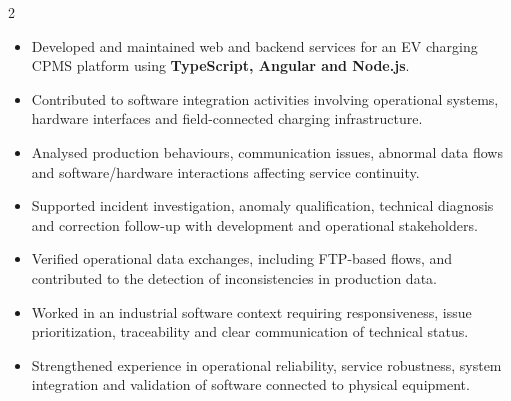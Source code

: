 \documentclass[8pt,a4paper,ragged2e,withhyper]{altacv}
\begin{document}



\makecvheader

\vspace{-0.3cm}


\begin{paracol}{2}



\begin{itemize}
\item Developed and maintained web and backend services for an EV charging CPMS platform using \textbf{TypeScript, Angular and Node.js}.
\item Contributed to software integration activities involving operational systems, hardware interfaces and field-connected charging infrastructure.
\item Analysed production behaviours, communication issues, abnormal data flows and software/hardware interactions affecting service continuity.
\item Supported incident investigation, anomaly qualification, technical diagnosis and correction follow-up with development and operational stakeholders.
\item Verified operational data exchanges, including FTP-based flows, and contributed to the detection of inconsistencies in production data.
\item Worked in an industrial software context requiring responsiveness, issue prioritization, traceability and clear communication of technical status.
\item Strengthened experience in operational reliability, service robustness, system integration and validation of software connected to physical equipment.
\end{itemize}

\divider


\end{paracol}
\end{document}
